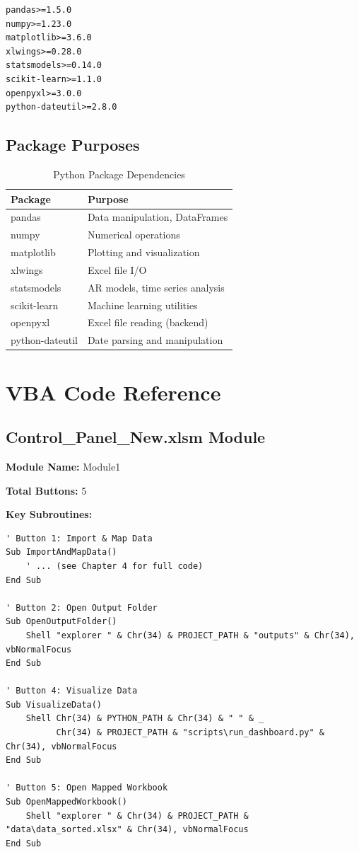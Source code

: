 \begin{lstlisting}
pandas>=1.5.0
numpy>=1.23.0
matplotlib>=3.6.0
xlwings>=0.28.0
statsmodels>=0.14.0
scikit-learn>=1.1.0
openpyxl>=3.0.0
python-dateutil>=2.8.0
\end{lstlisting}

\subsection{Package Purposes}

\begin{table}[H]
\centering
\begin{tabular}{ll}
\toprule
\textbf{Package} & \textbf{Purpose} \\
\midrule
pandas & Data manipulation, DataFrames \\
numpy & Numerical operations \\
matplotlib & Plotting and visualization \\
xlwings & Excel file I/O \\
statsmodels & AR models, time series analysis \\
scikit-learn & Machine learning utilities \\
openpyxl & Excel file reading (backend) \\
python-dateutil & Date parsing and manipulation \\
\bottomrule
\end{tabular}
\caption{Python Package Dependencies}
\end{table}

\section{VBA Code Reference}

\subsection{Control\_Panel\_New.xlsm Module}

\textbf{Module Name:} Module1

\textbf{Total Buttons:} 5

\textbf{Key Subroutines:}

\begin{lstlisting}[style=vbastyle]
' Button 1: Import & Map Data
Sub ImportAndMapData()
    ' ... (see Chapter 4 for full code)
End Sub

' Button 2: Open Output Folder
Sub OpenOutputFolder()
    Shell "explorer " & Chr(34) & PROJECT_PATH & "outputs" & Chr(34), vbNormalFocus
End Sub

' Button 4: Visualize Data
Sub VisualizeData()
    Shell Chr(34) & PYTHON_PATH & Chr(34) & " " & _
          Chr(34) & PROJECT_PATH & "scripts\run_dashboard.py" & Chr(34), vbNormalFocus
End Sub

' Button 5: Open Mapped Workbook
Sub OpenMappedWorkbook()
    Shell "explorer " & Chr(34) & PROJECT_PATH & "data\data_sorted.xlsx" & Chr(34), vbNormalFocus
End Sub
\end{lstlisting}

